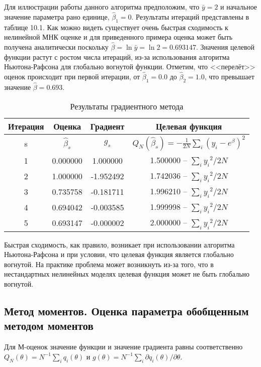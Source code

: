 Для иллюстрации работы данного алгоритма предположим, что $\bar{y}=2$ и начальное значение параметра рано единице, $\hat{\beta}_{1}=0$. Результаты итераций представлены в таблице 10.1. Как можно видеть существует очень быстрая сходимость к нелинейной МНК оценке и для приведенного примера оценка может быть получена аналитически поскольку $\hat{\beta} = \ln \bar{y} = \ln 2 = 0.693147$. Значения целевой функции растут с ростом числа итераций, из-за использования алгоритма Ньютона-Рафсона для глобально вогнутой функции. Отметим, что <<перелёт>> оценок происходит при первой итерации, от $\hat{\beta}_1 = 0.0$ до $\hat{\beta}_2 = 1.0$, что превышает значение $\hat{\beta} = 0.693$.

\begin{table}[h]
\begin{center}
\caption{\label{tab:gradres} Результаты градиентного метода}
\begin{tabular}{cccc}
\hline 
\hline
Итерация & Оценка & Градиент & Целевая функция \\ 
\hline 
s & $\hat{\beta}_s$& $g_s$ & $Q_N(\hat{\beta}_s)=-\frac{1}{2N}\sum_i(y_i-e^{\beta})^2$ \\ 
1 & 0.000000& 1.000000& 1.500000 -- $\sum_i{y_i}^2/2N$ \\ 
2 & 1.000000 & -1.952492 & 1.742036 -- $\sum_i{y_i}^2/2N$ \\ 
3 & 0.735758 & -0.181711 & 1.996210 -- $\sum_i{y_i}^2/2N$ \\ 
4 & 0.694042 & -0.003585 & 1.999998 -- $\sum_i{y_i}^2/2N$ \\ 
5 & 0.693147 & -0.000002 & 2.000000 -- $\sum_i{y_i}^2/2N$ \\ 
\hline 
\hline
\end{tabular} 
\end{center}
\end{table}

Быстрая сходимость, как правило, возникает при использовании алгоритма Ньютона-Рафсона и при условии, что целевая функция является глобально вогнутой. На практике проблема может возникнуть из-за того, что в нестандартных нелинейных моделях целевая функция может не быть глобально вогнутой.

\subsection{Метод моментов. Оценка параметра обобщенным методом моментов}

Для М-оценок значение функции и значение градиента равны соответственно $Q_N(\theta)=N^{-1}\sum_iq_i(\theta)$ и $g(\theta)=N^{-1}\sum_{i}\partial{q_i}(\theta)/\partial{\theta}$.

